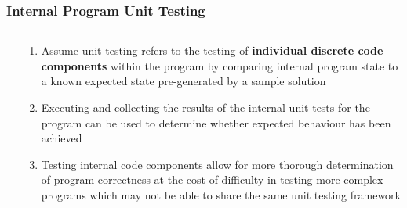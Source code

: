 \documentclass[xcolor]{beamer}
\begin{document}
\begin{frame}
	\frametitle{Internal Program Unit Testing}
	\begin{columns}
		\begin{column}{0.25\textwidth}
		\end{column}
		\begin{column}{0.7\textwidth}
			\begin{enumerate}
				\setlength\itemsep{0.75em}
				\item Assume unit testing refers to the testing of \textbf{individual discrete code components} within the program by comparing internal program state to a known expected state pre-generated by a sample solution
					\pause
				\item Executing and collecting the results of the internal unit tests for the program can be used to determine whether expected behaviour has been achieved
					\pause
				\item Testing internal code components allow for more thorough determination of program correctness at the cost of difficulty in testing more complex programs which may not be able to share the same unit testing framework
			\end{enumerate}
		\end{column}
	\end{columns}
\end{frame}
\end{document}
